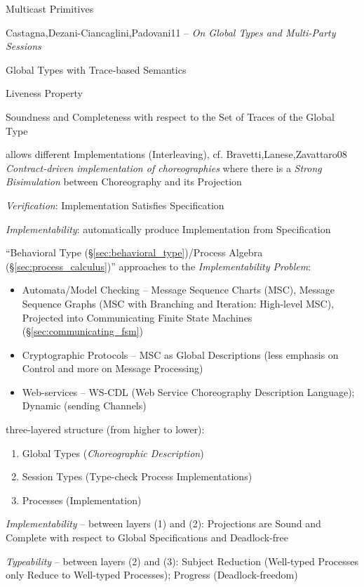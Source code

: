 Multicast Primitives


\asterism


Castagna,Dezani-Ciancaglini,Padovani11 -- \emph{On Global Types and
  Multi-Party Sessions}

Global Types with Trace-based Semantics

Liveness Property

Soundness and Completeness with respect to the Set of Traces of the
Global Type

allows different Implementations (Interleaving), cf.
Bravetti,Lanese,Zavattaro08 \emph{Contract-driven implementation of
  choreographies} where there is a \emph{Strong Bisimulation} between
Choreography and its Projection

\emph{Verification}: Implementation Satisfies Specification

\emph{Implementability}: automatically produce Implementation from
Specification

``Behavioral Type (\S\ref{sec:behavioral_type})/Process Algebra
(\S\ref{sec:process_calculus})'' approaches to the
\emph{Implementability Problem}:
\begin{itemize}
  \item Automata/Model Checking -- Message Sequence Charts (MSC),
    Message Sequence Graphs (MSC with Branching and Iteration:
    High-level MSC), Projected into Communicating Finite State
    Machines (\S\ref{sec:communicating_fsm})
  \item Cryptographic Protocols -- MSC as Global Descriptions (less
    emphasis on Control and more on Message Processing)
  \item Web-services -- WS-CDL (Web Service Choreography Description
    Language); Dynamic (sending Channels)
\end{itemize}

three-layered structure (from higher to lower):
\begin{enumerate}
  \item Global Types (\emph{Choreographic Description})
  \item Session Types (Type-check Process Implementations)
  \item Processes (Implementation)
\end{enumerate}

\emph{Implementability} -- between layers (1) and (2): Projections
are Sound and Complete with respect to Global Specifications and
Deadlock-free

\emph{Typeability} -- between layers (2) and (3): Subject Reduction
(Well-typed Processes only Reduce to Well-typed Processes); Progress
(Deadlock-freedom)



